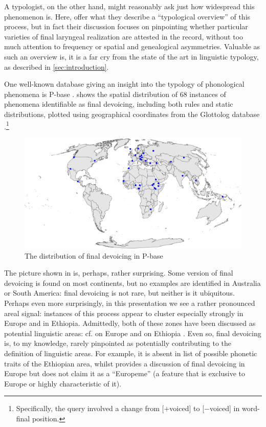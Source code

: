 \documentclass[output=paper,colorlinks,citecolor=brown]{langscibook}
\begin{document}
A typologist, on the other hand, might reasonably ask just how widespread this phenomenon is. Here, \textcite{iverson11:_final} offer what they describe a \enquote{typological overview} of this process, but in fact their discussion focuses on pinpointing whether particular varieties of final laryngeal realization are attested in the record, without too much attention to frequency or spatial and genealogical asymmetries. Valuable as such an overview is, it is a far cry from the state of the art in linguistic typology, as described in \cref{sec:introduction}. 

One well\hyp known database giving an insight into the typology of phonological phenomena is P-base \parencite{mielke-diss, brohan2018frequent}.  shows the spatial distribution of 68 instances of phenomena identifiable as final devoicing, including both rules and static distributions, plotted using geographical coordinates from the Glottolog database \parencite{glottolog}.\footnote{Specifically, the query involved a change from \mbox{[\ensuremath{+}voiced]} to \mbox{[\ensuremath{-}voiced]} in word\hyp final position.}

\begin{figure}
 \caption{The distribution of final devoicing in P-base}
 \label{fig:final-devoicing}
 \includegraphics[width=\linewidth]{figures/final-devoicing.pdf}
\end{figure}

The picture shown in  is, perhaps, rather surprising. Some version of final devoicing is found on most continents, but no examples are identified in Australia or South America: final devoicing is not rare, but neither is it ubiquitous. Perhaps even more surprisingly, in this presentation we see a rather pronounced areal signal: instances of this process appear to cluster especially strongly in Europe and in Ethiopia. Admittedly, both of these zones have been discussed as potential linguistic areas: cf. \textcite{könig1999sprachbund} on Europe and \textcite{ferguson1976ethiopian} on Ethiopia \parencite[but see the contrary view in][]{tosco2000is}. Even so, final devoicing is, to my knowledge, rarely pinpointed as potentially contributing to the definition of linguistic areas. For example, it is absent in  list of possible phonetic traits of the Ethiopian area, whilst \textcite{ternes2010phonetische} provides a discussion of final devoicing in Europe but does not claim it as a \enquote{Europeme} (a feature that is exclusive to Europe or highly characteristic of it).
\end{document}
